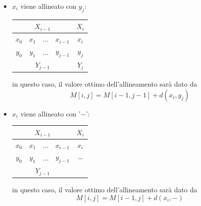     \begin{itemize}
        \item $x_i$ viene allineato con $y_j$: 
        \vspace{5pt}
        \begin{table}[h]
            \centering
            \begin{tabular}{|cccc|c|}
            \hline
                \multicolumn{4}{|c|}{$X_{i-1}$} & $X_i$\\
            \hline
                $x_0$ & $x_1$ & ... & $x_{i-1}$ & $x_i$ \\
                 $y_0$ & $y_1$ & ... & $y_{j-1}$ & $y_j$ \\
            \hline
                \multicolumn{4}{|c|}{$Y_{j-1}$} & $Y_j$\\
            \hline
            \end{tabular}
        \end{table}
        \vspace{5pt}
        
        in questo caso, il valore ottimo dell'allineamento sarà dato da
        $$M[i, j] = M[i-1, j-1] + d(x_i, y_j)$$
        
        \item $x_i$ viene allineato con '$-$': 
        \vspace{5pt}
        \begin{table}[h]
            \centering
            \begin{tabular}{|cccc|c|}
            \hline
                \multicolumn{4}{|c|}{$X_{i-1}$} & $X_i$\\
            \hline
                $x_0$ & $x_1$ & ... & $x_{i-1}$ & $x_i$ \\
                 $y_0$ & $y_1$ & ... & $y_{j-1}$ & $-$ \\
            \hline
                \multicolumn{4}{|c|}{$Y_{j-1}$} & \\
            \hline
            \end{tabular}
        \end{table}
        \vspace{5pt}
        
        in questo caso, il valore ottimo dell'allineamento sarà dato da
        $$M[i, j] = M[i-1, j] + d(x_i, -)$$
        \clearpage
        

\end{itemize}
